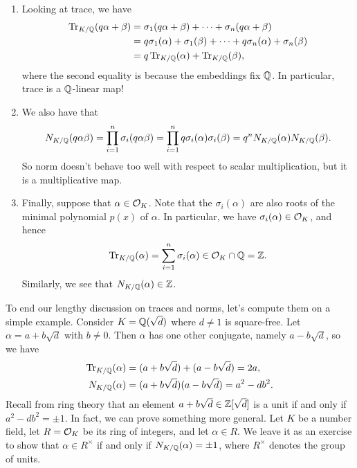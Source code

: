 \begin{enumerate}[(1)]
    \item Looking at trace, we have 
    \begin{align*}
        \operatorname{Tr}_{K/\mathbb{Q}}(q\alpha + \beta) 
        &= \sigma_1(q\alpha + \beta) + \cdots + \sigma_n(q\alpha + \beta) \\ 
        &= q\sigma_1(\alpha) + \sigma_1(\beta) + \cdots + q\sigma_n(\alpha) + \sigma_n(\beta) \\ 
        &= q\operatorname{Tr}_{K/\mathbb{Q}}(\alpha) + \operatorname{Tr}_{K/\mathbb{Q}}(\beta),
    \end{align*}
    where the second equality is because the embeddings fix $\mathbb{Q}$.
    In particular, trace is a $\mathbb{Q}$-linear map! 
    
    \item We also have that 
    \[ N_{K/\mathbb{Q}}(q\alpha\beta) = \prod_{i=1}^n \sigma_i(q\alpha\beta) 
    = \prod_{i=1}^n q\sigma_i(\alpha) \sigma_i(\beta) = q^n N_{K/\mathbb{Q}}(\alpha) 
    N_{K/\mathbb{Q}}(\beta). \] 
    So norm doesn't behave too well with respect to scalar multiplication, but 
    it is a multiplicative map.
    
    \item Finally, suppose that $\alpha \in {\cal O}_K$. Note that the 
    $\sigma_i(\alpha)$ are also roots of the minimal polynomial 
    $p(x)$ of $\alpha$. In particular, we have $\sigma_i(\alpha) \in {\cal O}_K$, 
    and hence 
    \[ \operatorname{Tr}_{K/\mathbb{Q}}(\alpha) = \sum_{i=1}^n \sigma_i(\alpha) \in {\cal O}_K \cap \mathbb{Q} = \mathbb{Z}. \] 
    Similarly, we see that $N_{K/\mathbb{Q}}(\alpha) \in \mathbb{Z}$. 
\end{enumerate} 
To end our lengthy discussion on traces and norms, let's compute them 
on a simple example. Consider $K = \mathbb{Q}(\sqrt{d})$ where $d \neq 1$ is square-free.
Let $\alpha = a + b\sqrt{d}$ with $b \neq 0$. Then $\alpha$ has one 
other conjugate, namely $a - b\sqrt{d}$, so we have 
\begin{align*}
    \operatorname{Tr}_{K/\mathbb{Q}}(\alpha) &= (a + b\sqrt{d}) + (a - b\sqrt{d}) = 2a, \\
    N_{K/\mathbb{Q}}(\alpha) &= (a + b\sqrt{d})(a - b\sqrt{d}) = a^2 - db^2.
\end{align*}
Recall from ring theory that an element $a + b\sqrt{d} \in \mathbb{Z}[\sqrt{d}]$ is a 
unit if and only if $a^2 - db^2 = \pm1$. In fact, we can prove something more 
general. Let $K$ be a number field, let $R = {\cal O}_K$ be its ring of integers, 
and let $\alpha \in R$. We leave it as an exercise to show that $\alpha \in R^\times$ 
if and only if $N_{K/\mathbb{Q}}(\alpha) = \pm1$, where $R^\times$ denotes the group of units. 

